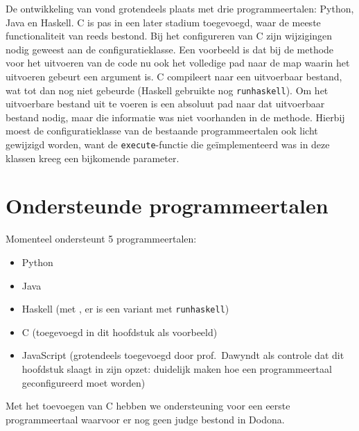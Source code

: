De ontwikkeling van \tested{} vond grotendeels plaats met drie programmeertalen: Python, Java en Haskell.
C is pas in een later stadium toegevoegd, waar de meeste functionaliteit van \tested{} reeds bestond.
Bij het configureren van C zijn wijzigingen nodig geweest aan de configuratieklasse.
Een voorbeeld is dat bij de methode voor het uitvoeren van de code nu ook het volledige pad naar de map waarin het uitvoeren gebeurt een argument is.
C compileert naar een uitvoerbaar bestand, wat tot dan nog niet gebeurde (Haskell gebruikte nog \texttt{runhaskell}).
Om het uitvoerbare bestand uit te voeren is een absoluut pad naar dat uitvoerbaar bestand nodig, maar die informatie was niet voorhanden in de methode.
Hierbij moest de configuratieklasse van de bestaande programmeertalen ook licht gewijzigd worden, want de \texttt{execute}-functie die geïmplementeerd was in deze klassen kreeg een bijkomende parameter.

\section{Ondersteunde programmeertalen}\label{sec:programmeertalen-in-tested}

Momenteel ondersteunt \tested{} 5 programmeertalen:

\begin{itemize}
    \item Python
    \item Java
    \item Haskell (met , er is een variant met \texttt{runhaskell})
    \item C (toegevoegd in dit hoofdstuk als voorbeeld)
    \item JavaScript (grotendeels toegevoegd door prof.\ Dawyndt als controle dat dit hoofdstuk slaagt in zijn opzet: duidelijk maken hoe een programmeertaal geconfigureerd moet worden)
\end{itemize}

Met het toevoegen van C hebben we ondersteuning voor een eerste programmeertaal waarvoor er nog geen judge bestond in Dodona.
